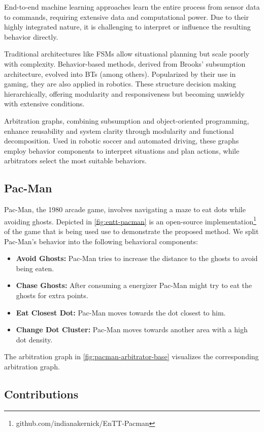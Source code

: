 End-to-end machine learning approaches learn the entire process from sensor data to commands, requiring extensive data and computational power.
Due to their highly integrated nature, it is challenging to interpret or influence the resulting behavior directly.

Traditional architectures like \glspl{FSM} allow situational planning but scale poorly with complexity. Behavior-based methods, derived from Brooks' subsumption architecture, evolved into \glspl{BT} (among others). Popularized by their use in gaming, they are also applied in robotics. These structure decision making hierarchically, offering modularity and responsiveness but becoming unwieldy with extensive conditions.

Arbitration graphs, combining subsumption and object-oriented programming, enhance reusability and system clarity through modularity and functional decomposition. Used in robotic soccer and automated driving, these graphs employ behavior components to interpret situations and plan actions, while arbitrators select the most suitable behaviors.

\subsection{Pac-Man}
Pac-Man, the 1980 arcade game, involves navigating a maze to eat dots while avoiding ghosts.
Depicted in \cref{fig:entt-pacman} is an open-source implementation\footnote{github.com/indianakernick/EnTT-Pacman} of the game that is being used use to demonstrate the proposed method.
We split Pac-Man's behavior into the following behavioral components:

\begin{itemize}
    \item \textbf{Avoid Ghosts:} Pac-Man tries to increase the distance to the ghosts to avoid being eaten.
    \item \textbf{Chase Ghosts:} After consuming a energizer Pac-Man might try to eat the ghosts for extra points.
    \item \textbf{Eat Closest Dot:} Pac-Man moves towards the dot closest to him.
    \item \textbf{Change Dot Cluster:} Pac-Man moves towards another area with a high dot density.
\end{itemize}

The arbitration graph in \cref{fig:pacman-arbitrator-base} visualizes the corresponding arbitration graph.

\subsection{Contributions}


